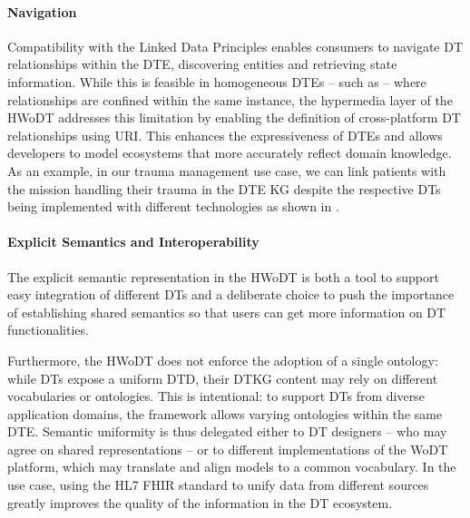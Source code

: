 \paragraph{Navigation}
Compatibility with the Linked Data Principles enables consumers to navigate \ac{DT} relationships within the \ac{DTE}, discovering entities and retrieving state information.
%
While this is feasible in homogeneous \acp{DTE} -- such as \azureTwin{} -- where relationships are confined within the same instance, the hypermedia layer of the \ac{HWoDT} addresses this limitation by enabling the definition of cross-platform \ac{DT} relationships using \ac{URI}.   
This enhances the expressiveness of \acp{DTE} and allows developers to model ecosystems that more accurately reflect domain knowledge.
%
As an example, in our trauma management use case, we can link patients with the mission handling their trauma in the \ac{DTE} \ac{KG} despite the respective \acp{DT} being implemented with different technologies as shown in .
% 

%     

\paragraph{Explicit Semantics and Interoperability}

The explicit semantic representation in the \ac{HWoDT} is both a tool to support easy integration of different \acp{DT} and a deliberate choice to push the importance of establishing shared semantics so that users can get more information on \ac{DT} functionalities.

Furthermore, the \ac{HWoDT} does not enforce the adoption of a single ontology: while \acp{DT} expose a uniform \ac{DTD}, their \ac{DTKG} content may rely on different vocabularies or ontologies.
This is intentional: to support \acp{DT} from diverse application domains, the framework allows varying ontologies within the same \ac{DTE}.  
Semantic uniformity is thus delegated either to \ac{DT} designers -- who may agree on shared representations -- or to different implementations of the \ac{WoDT} platform, which may translate and align models to a common vocabulary. 
%
In the use case, using the HL7 FHIR standard to unify data from different sources greatly improves the quality of the information in the \ac{DT} ecosystem.

